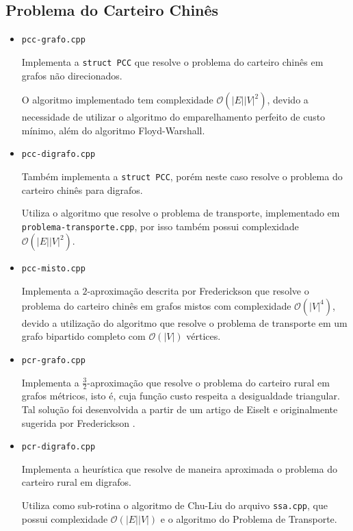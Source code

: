 \subsection{Problema do Carteiro Chinês}
\begin{itemize}
    \item \texttt{pcc-grafo.cpp}

        Implementa a \texttt{struct PCC} que resolve o problema do carteiro chinês em grafos não direcionados. 

        O algoritmo implementado tem complexidade $\mathcal{O}(|E||V|^2)$, devido a necessidade de utilizar o algoritmo do emparelhamento perfeito de custo mínimo, além do algoritmo Floyd-Warshall.
    \item \texttt{pcc-digrafo.cpp}

        Também implementa a \texttt{struct PCC}, porém neste caso resolve o problema do carteiro chinês para digrafos.

        Utiliza o algoritmo que resolve o problema de transporte, implementado em \texttt{problema-transporte.cpp}, por isso também possui complexidade $\mathcal{O}(|E||V|^2)$.
    \item \texttt{pcc-misto.cpp}

        Implementa a $2$-aproximação descrita por Frederickson \cite{frederickson} que resolve o problema do carteiro chinês em grafos mistos com complexidade $\mathcal{O}(|V|^4)$, devido a utilização do algoritmo que resolve o problema de transporte em um grafo bipartido completo com $\mathcal{O}(|V|)$ vértices.

    \item \texttt{pcr-grafo.cpp}
        
        Implementa a $\frac{3}{2}$-aproximação que resolve o problema do carteiro rural em grafos métricos, isto é, cuja função custo respeita a desigualdade triangular.  
        Tal solução foi desenvolvida a partir de um artigo de Eiselt \cite{michel} e originalmente sugerida por Frederickson \cite{frederickson}.
        
    \item \texttt{pcr-digrafo.cpp}

        Implementa a heurística que resolve de maneira aproximada o problema do carteiro rural em digrafos.

        Utiliza como sub-rotina o algoritmo de Chu-Liu do arquivo \texttt{ssa.cpp}, que possui complexidade $\mathcal{O}(|E||V|)$ e o algoritmo do Problema de Transporte.


\end{itemize}
